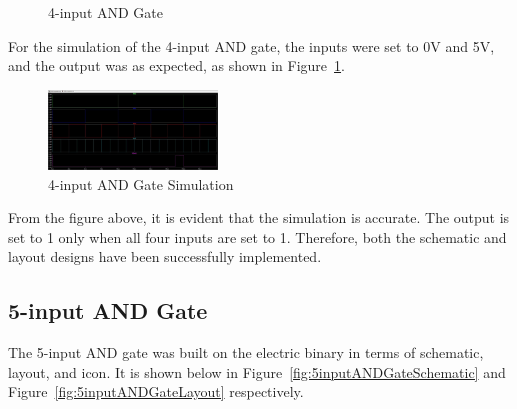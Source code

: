 \documentclass[conference]{IEEEtran}
\begin{document}
\begin{figure}[h]
    \centering
    \hfill
    \caption{4-input AND Gate}
\end{figure}
For the simulation of the 4-input AND gate, the inputs were set to 0V and 5V, and the output was as expected, as shown in Figure~\ref{fig:4inputANDGateSimulation}.
\begin{figure}[h]
    \centering
    \includegraphics[width=0.4\textwidth]{assets/4inputANDGateSimulation.jpg}
    \caption{4-input AND Gate Simulation}
    \label{fig:4inputANDGateSimulation}
\end{figure}
From the figure above, it is evident that the simulation is accurate. The output is set to 1 only when all four inputs are set to 1. Therefore, both the schematic and layout designs have been successfully implemented.

\subsection{5-input AND Gate}
The 5-input AND gate was built on the electric binary in terms of schematic, layout, and icon. It is shown below in Figure~\ref{fig:5inputANDGateSchematic} and Figure~\ref{fig:5inputANDGateLayout} respectively.
\end{document}
